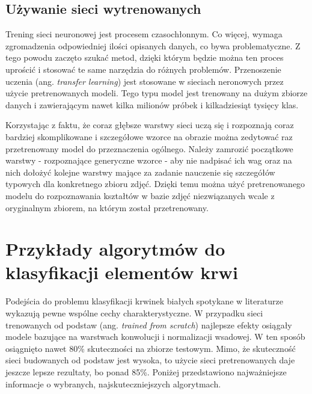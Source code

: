 \subsection{Używanie sieci wytrenowanych}

Trening sieci neuronowej jest procesem czasochłonnym. Co więcej, wymaga zgromadzenia odpowiedniej ilości opisanych danych, co bywa problematyczne. Z tego powodu zaczęto szukać metod, dzięki którym będzie można ten proces uprościć i stosować te same narzędzia do różnych problemów. Przenoszenie uczenia (ang. \textit{transfer learning}) jest stosowane w sieciach neronowych przez użycie pretrenowanych modeli. Tego typu model jest trenowany na dużym zbiorze danych i zawierającym nawet kilka milionów próbek i kilkadziesiąt tysięcy klas. 

{\parindent0pt %
Korzystając z faktu, że coraz głębsze warstwy sieci uczą się i rozpoznają coraz bardziej skomplikowane i szczegółowe wzorce na obrazie można zedytować raz przetrenowany model do przeznaczenia ogólnego. Należy zamrozić początkowe warstwy - rozpoznające generyczne wzorce - aby nie nadpisać ich wag oraz na nich dołożyć kolejne warstwy mające za zadanie nauczenie się szczegółów typowych dla konkretnego zbioru zdjęć. Dzięki temu można użyć pretrenowanego modelu do rozpoznawania kształtów w bazie zdjęć niezwiązanych wcale z oryginalnym zbiorem, na którym został przetrenowany. 
}

\section{Przykłady algorytmów do klasyfikacji elementów krwi}

Podejścia do problemu klasyfikacji krwinek białych spotykane w literaturze wykazują pewne wspólne cechy charakterystyczne. W przypadku sieci trenowanych od podstaw (ang. \textit{trained from scratch}) najlepsze efekty osiągały modele bazujące na warstwach konwolucji i normalizacji wsadowej. W ten sposób osiągnięto nawet 80\% skuteczności na zbiorze testowym. Mimo, że skuteczność sieci budowanych od podstaw jest wysoka, to użycie sieci pretrenowanych daje jeszcze lepsze rezultaty, bo ponad 85\%. Poniżej przedstawiono najważniejsze informacje o wybranych, najskuteczniejszych algorytmach.

